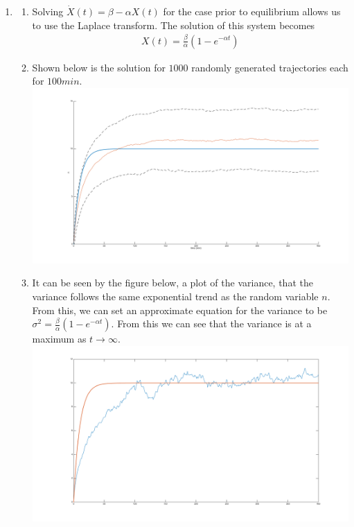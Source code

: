 \documentclass[10pt]{article}
\begin{document}
\begin{enumerate}
\item \begin{enumerate}
\item Solving $\dot{X}(t) = \beta - \alpha X(t)$ for the case prior to equilibrium allows us to use the Laplace transform. The solution of this system becomes \begin{align*} X(t) = \frac{\beta}{\alpha} (1 - e^{-\alpha t}) \end{align*}
\item Shown below is the solution for $1000$ randomly generated trajectories each for $100 min$. \\ \includegraphics[scale=0.2]{sbe3hw12q2b.png}
\item It can be seen by the figure below, a plot of the variance, that the variance follows the same exponential trend as the random variable $n$. From this, we can set an approximate equation for the variance to be $\sigma^2 = \frac{\beta}{\alpha} (1 - e^{-\alpha t}) $. From this we can see that the variance is at a maximum as $t \to \infty$. \includegraphics[scale=0.2]{sbe3hw12q2c.png}
\end{enumerate}


\end{enumerate}
\end{document}
